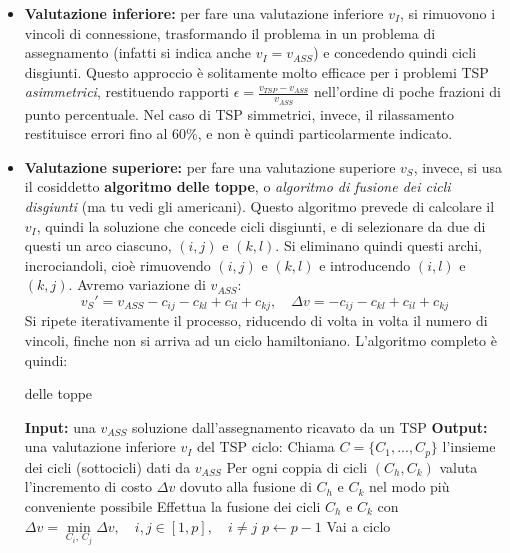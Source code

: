 \documentclass[a4paper,11pt]{article}
\begin{document}
\begin{itemize}
	\item \textbf{Valutazione inferiore:} per fare una valutazione inferiore $v_I$, si rimuovono i vincoli di connessione, trasformando il problema in un problema di assegnamento (infatti si indica anche $v_I = v_{ASS}$) e concedendo quindi cicli disgiunti.
		Questo approccio è solitamente molto efficace per i problemi TSP \textit{asimmetrici}, restituendo rapporti $\epsilon = \frac{v_{TSP} - v_{ASS}}{v_{ASS}}$ nell'ordine di poche frazioni di punto percentuale.
		Nel caso di TSP simmetrici, invece, il rilassamento restituisce errori fino al $60\%$, e non è quindi particolarmente indicato.
	\item \textbf{Valutazione superiore:} per fare una valutazione superiore $v_S$, invece, si usa il cosiddetto \textbf{algoritmo delle toppe}, o \textit{algoritmo di fusione dei cicli disgiunti} (ma tu vedi gli americani).
Questo algoritmo prevede di calcolare il $v_I$, quindi la soluzione che concede cicli disgiunti, e di selezionare da due di questi un arco ciascuno, $(i, j)$ e $(k, l)$.
Si eliminano quindi questi archi, incrociandoli, cioè rimuovendo $(i, j)$ e $(k, l)$ e introducendo $(i,l)$ e $(k, j)$.
Avremo variazione di $v_{ASS}$:
$$ 
v_S' = v_{ASS} - c_{ij} - c_{kl} + c_{il} + c_{kj}, \quad \Delta v = -c_{ij} - c_{kl} + c_{il} + c_{kj}
$$
Si ripete iterativamente il processo, riducendo di volta in volta il numero di vincoli, finche non si arriva ad un ciclo hamiltoniano.
L'algoritmo completo è quindi:

\begin{algorithm}
\caption{delle toppe}
\begin{algorithmic}
	\STATE \textbf{Input:} una $v_{ASS}$ soluzione dall'assegnamento ricavato da un TSP %
	\STATE \textbf{Output:} una valutazione inferiore $v_I$ del TSP %
	\STATE \textsf{ciclo:}
	\STATE Chiama $C = \{ C_1, ..., C_p \}$ l'insieme dei cicli (sottocicli) dati da $v_{ASS}$
	\STATE Per ogni coppia di cicli $(C_h, C_k)$ valuta l'incremento di costo $\Delta v$ dovuto alla fusione di $C_h$ e $C_k$ nel modo più conveniente possibile
	\STATE Effettua la fusione dei cicli $C_h$ e $C_k$ con $\Delta v = \min\limits_{C_i, \, C_j} \Delta v, \quad i, j \in [1, p], \quad i \neq j$
	\STATE $p \leftarrow p - 1$
		\STATE Vai a \textsf{ciclo}
	\ENDIF
\end{algorithmic}
\end{algorithm}

\end{itemize}
\end{document}
